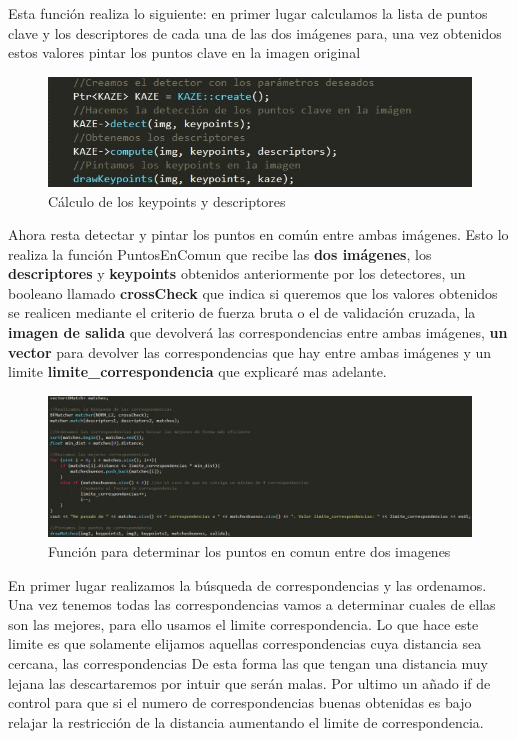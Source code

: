 Esta función realiza lo siguiente: en primer lugar calculamos la lista de puntos clave y los descriptores de cada una de las dos imágenes para, una vez obtenidos estos valores pintar los puntos clave en la imagen original

\begin{figure}[H]
\centering
\includegraphics[width=0.8\linewidth]{codigokaze_sub}
\caption{Cálculo de los keypoints y descriptores}
\label{fig:codigokazesub}
\end{figure}

Ahora resta detectar y pintar los puntos en común entre ambas imágenes. Esto lo realiza la función PuntosEnComun que recibe las \textbf{dos
imágenes}, los \textbf{descriptores} y \textbf{keypoints} obtenidos anteriormente por los detectores, un booleano llamado \textbf{crossCheck} que indica si queremos que los valores obtenidos se realicen mediante el criterio de fuerza bruta o el de validación cruzada, la \textbf{imagen de salida} que devolverá las correspondencias entre ambas imágenes, \textbf{un vector} para devolver las correspondencias que hay entre ambas imágenes y un limite
\textbf{limite\_correspondencia} que explicaré mas adelante.

\begin{figure}[H]
\centering
\includegraphics[width=1\linewidth]{puntosencomun}
\caption{Función para determinar los puntos en comun entre dos imagenes}
\label{fig:puntosencomun}
\end{figure}

En primer lugar realizamos la búsqueda de correspondencias y las ordenamos. Una vez tenemos todas las correspondencias vamos a determinar cuales de ellas son las mejores, para ello usamos el limite correspondencia. Lo que hace este limite es que solamente elijamos aquellas correspondencias cuya distancia sea cercana, las correspondencias  De esta forma las que tengan una distancia muy lejana las descartaremos por intuir que serán malas. Por ultimo un añado if de control para que si el numero de correspondencias buenas obtenidas es bajo relajar la restricción de la distancia aumentando el limite de correspondencia.\\


